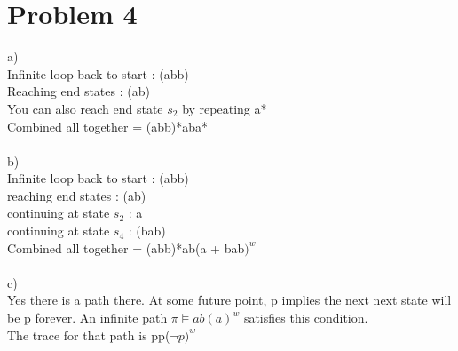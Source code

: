 \documentclass{article}
\begin{document}
\section{Problem 4}
a)\\
Infinite loop back to start : (abb)\\
Reaching end states : (ab)\\
You can also reach end state $s_2$ by repeating a*\\
Combined all together = (abb)*aba*\\
\\
b)\\
Infinite loop back to start : (abb)\\
reaching end states : (ab)\\
continuing at state $s_2$ : a\\
continuing at state $s_4$ : (bab)\\
Combined all together = (abb)*ab(a + bab$)^w$\\
\\
c)\\
Yes there is a path there. At some future point, p implies the next next state will be p forever. An infinite path $\pi \vDash ab(a)^w$ satisfies this condition.\\ 
The trace for that path is pp($\neg p)^w$\\
\end{document}
